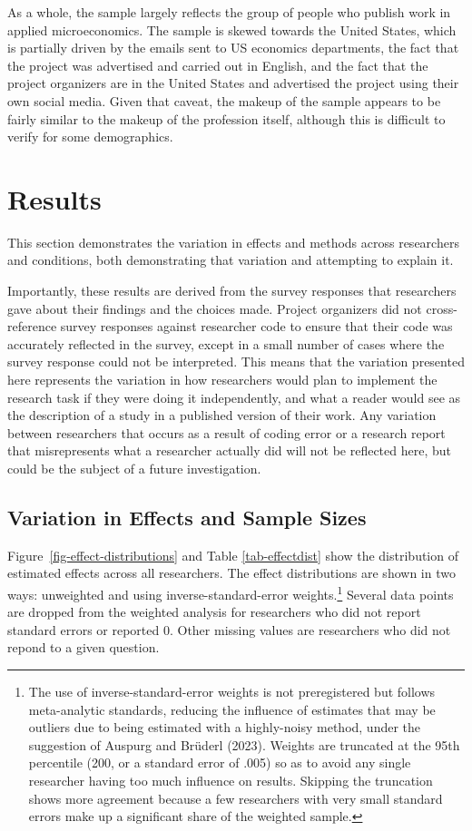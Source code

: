 \documentclass[
  letterpaper,
  DIV=11,
  numbers=noendperiod]{scrartcl}
\begin{document}
As a whole, the sample largely reflects the group of people who publish
work in applied microeconomics. The sample is skewed towards the United
States, which is partially driven by the emails sent to US economics
departments, the fact that the project was advertised and carried out in
English, and the fact that the project organizers are in the United
States and advertised the project using their own social media. Given
that caveat, the makeup of the sample appears to be fairly similar to
the makeup of the profession itself, although this is difficult to
verify for some demographics.

\hypertarget{results}{%
\section{Results}\label{results}}

This section demonstrates the variation in effects and methods across
researchers and conditions, both demonstrating that variation and
attempting to explain it.

Importantly, these results are derived from the survey responses that
researchers gave about their findings and the choices made. Project
organizers did not cross-reference survey responses against researcher
code to ensure that their code was accurately reflected in the survey,
except in a small number of cases where the survey response could not be
interpreted. This means that the variation presented here represents the
variation in how researchers would plan to implement the research task
if they were doing it independently, and what a reader would see as the
description of a study in a published version of their work. Any
variation between researchers that occurs as a result of coding error or
a research report that misrepresents what a researcher actually did will
not be reflected here, but could be the subject of a future
investigation.

\hypertarget{sec-variation}{%
\subsection{Variation in Effects and Sample Sizes}\label{sec-variation}}

Figure~\ref{fig-effect-distributions} and Table \ref{tab-effectdist}
show the distribution of estimated effects across all researchers. The
effect distributions are shown in two ways: unweighted and using
inverse-standard-error weights.\footnote{The use of
  inverse-standard-error weights is not preregistered but follows
  meta-analytic standards, reducing the influence of estimates that may
  be outliers due to being estimated with a highly-noisy method, under
  the suggestion of Auspurg and Brüderl (2023). Weights are truncated at
  the 95th percentile (200, or a standard error of .005) so as to avoid
  any single researcher having too much influence on results. Skipping
  the truncation shows more agreement because a few researchers with
  very small standard errors make up a significant share of the weighted
  sample.} Several data points are dropped from the weighted analysis
for researchers who did not report standard errors or reported 0. Other
missing values are researchers who did not repond to a given question.
\end{document}
